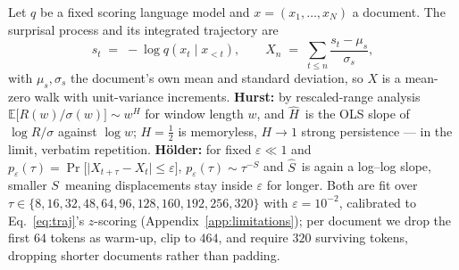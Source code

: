\documentclass{article}
\newcommand{\Sest}{\ensuremath{\widehat{S}}}
\newcommand{\Hest}{\ensuremath{\widehat{H}}}
\newcommand{\Strue}{\ensuremath{S}}
\newcommand{\Htrue}{\ensuremath{H}}
\begin{document}
Let $q$ be a fixed scoring language model and $x=(x_1,\dots,x_N)$ a document. The
surprisal process and its integrated trajectory are
\begin{equation}
  s_t \;=\; -\log q\!\left(x_t \mid x_{<t}\right),
  \qquad
  X_n \;=\; \sum_{t \le n} \frac{s_t - \mu_s}{\sigma_s},
  \label{eq:traj}
\end{equation}
with $\mu_s,\sigma_s$ the document's own mean and standard deviation, so $X$ is a
mean-zero walk with unit-variance increments. \textbf{Hurst:} by rescaled-range analysis
$\mathbb{E}\big[R(w)/\sigma(w)\big] \sim w^{\Htrue}$ for window length $w$, and \Hest\
is the OLS slope of $\log R/\sigma$ against $\log w$; $\Htrue=\tfrac12$ is memoryless,
$\Htrue\to1$ strong persistence --- in the limit, verbatim repetition.
\textbf{H\"older:} for fixed $\varepsilon\!\ll\!1$ and
$p_\varepsilon(\tau)=\Pr\big[\lvert X_{t+\tau}-X_t\rvert \le \varepsilon\big]$,
$p_\varepsilon(\tau)\sim\tau^{-\Strue}$ and \Sest\ is again a log--log slope,
smaller \Strue\ meaning displacements stay inside $\varepsilon$ for longer.
Both are fit over $\tau\in\{8,16,32,48,64,96,128,160,192,256,320\}$ with
$\varepsilon=10^{-2}$, calibrated to Eq.~\ref{eq:traj}'s $z$-scoring
(Appendix~\ref{app:limitations}); per
document we drop the first $64$ tokens as warm-up, clip to $464$, and require
$320$ surviving tokens, dropping shorter documents rather than padding.
\end{document}
